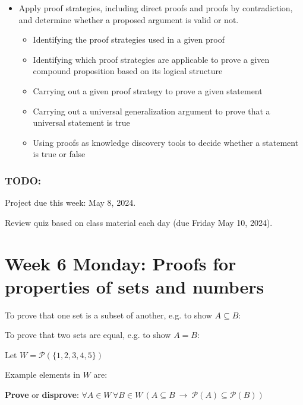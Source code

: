 \documentclass[12pt, oneside]{article}
\begin{document}
\begin{itemize}
\item Apply proof strategies, including direct proofs and proofs by contradiction, and determine whether a proposed argument is valid or not.
\begin{itemize}
    \item Identifying the proof strategies used in a given proof
    \item Identifying which proof strategies are applicable to prove a given compound proposition based on its logical structure
    \item Carrying out a given proof strategy to prove a given statement
    \item Carrying out a universal generalization argument to prove that a universal statement is true
    \item Using proofs as knowledge discovery tools to decide whether a statement is true or false
\end{itemize}
\end{itemize}

\subsubsection*{TODO:}
\begin{list}
   {\itemsep2pt}
   \item Project due this week: May 8, 2024. 
   \item Review quiz based on class material each day (due Friday May 10, 2024).
\end{list}

\newpage

\section*{Week 6 Monday: Proofs for properties of sets and numbers}


To prove that one set is a subset of another, e.g. to show $A \subseteq B$:

\vspace{50pt}

To prove that two sets are equal, e.g. to show $A = B$:

\vspace{50pt}
 

Let $W =  \mathcal{P}(  \{ 1,2,3,4,5\} )$

Example elements in $W$ are:
\vspace{20pt}


{\bf Prove} or {\bf  disprove}:  $\forall  A \in W\,  \forall B \in W\,  \left( A \subseteq B
~\to ~ \mathcal{P}(A) \subseteq \mathcal{P}(B) \right)$
\end{document}
